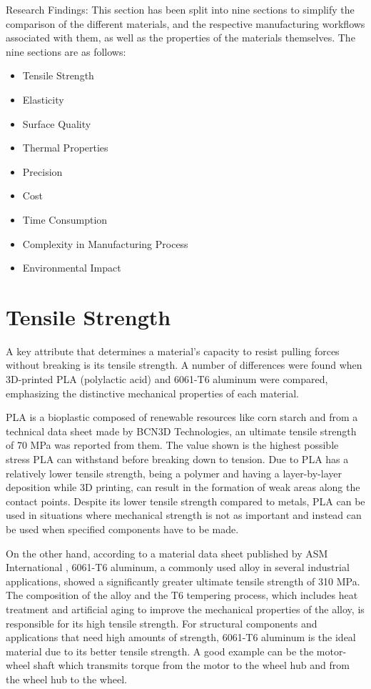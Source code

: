 Research Findings:
This section has been split into nine sections to simplify the comparison of the different materials, and the respective manufacturing workflows associated with them, as well as the properties of the materials themselves. The nine sections are as follows:

\begin{itemize}[itemsep=2mm]
    \item Tensile Strength
    \item Elasticity
    \item Surface Quality
    \item Thermal Properties
    \item Precision
    \item Cost
    \item Time Consumption
    \item Complexity in Manufacturing Process
    \item Environmental Impact
\end{itemize}


\section{Tensile Strength}

    A key attribute that determines a material's capacity to resist pulling forces without breaking is its
    tensile strength. A number of differences were found when 3D-printed PLA (polylactic acid) and 6061-T6 aluminum were compared, emphasizing the distinctive mechanical properties of each material.

    PLA is a bioplastic composed of renewable resources like corn starch and from a technical data sheet
    made by BCN3D Technologies, an ultimate tensile strength of 70 MPa was reported from them.\cite{pla_spec} 
    The value shown is the highest possible stress PLA can withstand before breaking down to tension. Due to
    PLA has a relatively lower tensile strength, being a polymer and having a layer-by-layer deposition while 3D printing, can result in the formation of weak areas along the contact points. Despite its lower
    tensile strength compared to metals, PLA can be used in situations where mechanical strength is not as important and instead can be used when specified components have to be made.
    

    On the other hand, according to a material data sheet published by ASM International \cite{aluminum_spec}
    , 6061-T6 aluminum, a commonly used alloy in several industrial applications, showed a significantly greater
    ultimate tensile strength of 310 MPa. The composition of the alloy and the T6 tempering process, which
    includes heat treatment and artificial aging to improve the mechanical properties of the alloy, is responsible for its high tensile strength. For structural components and applications that need high
    amounts of strength, 6061-T6 aluminum is the ideal material due to its better tensile strength. A good
    example can be the motor-wheel shaft which transmits torque from the motor to the wheel hub and from
    the wheel hub to the wheel.

